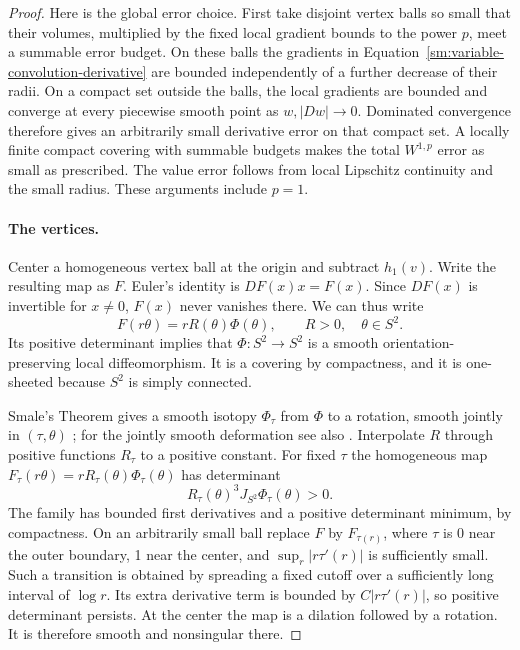 \documentclass[11pt]{article}
\numberwithin{equation}{section}
\theoremstyle{definition}
\theoremstyle{remark}
\begin{document}
\begin{proof}
Here is the global error choice.  First take disjoint vertex balls
so small that their volumes, multiplied by the fixed local
gradient bounds to the power $p$, meet a summable error budget.
On these balls the gradients in
Equation~\eqref{sm:variable-convolution-derivative} are bounded independently
of a further decrease of their radii.  On a compact set outside
the balls, the local gradients are bounded and converge at every
piecewise smooth point as $w,|Dw|\to0$.  Dominated convergence
therefore gives an arbitrarily small derivative error on that
compact set.  A locally finite compact covering with summable
budgets makes the total $W^{1,p}$ error as small as prescribed.
The value error follows from local Lipschitz continuity and the
small radius.  These arguments include $p=1$.

\paragraph{The vertices.}
Center a homogeneous vertex ball at the origin and subtract
$h_1(v)$.  Write the resulting map as $F$.  Euler's identity is
$DF(x)x=F(x)$.  Since $DF(x)$ is invertible for $x\ne0$, $F(x)$
never vanishes there.  We can thus write
\begin{equation}
 \label{sm:vertex-form}
 F(r\theta)=rR(\theta)\Phi(\theta),\qquad
 R>0,\quad\theta\in S^2.
\end{equation}
Its positive determinant implies that $\Phi:S^2\to S^2$ is a
smooth orientation-preserving local diffeomorphism.  It is a
covering by compactness, and it is one-sheeted because $S^2$ is
simply connected.

Smale's Theorem gives a smooth isotopy $\Phi_\tau$ from $\Phi$
to a rotation, smooth jointly in $(\tau,\theta)$
\cite[Theorem~6]{Smale1959}; for the jointly smooth deformation see also
\cite[Theorem~1.5]{LiWatts2011}.  Interpolate $R$ through positive
functions $R_\tau$ to a positive constant.  For fixed $\tau$ the
homogeneous map
$F_\tau(r\theta)=rR_\tau(\theta)\Phi_\tau(\theta)$
has determinant
\[
 R_\tau(\theta)^3 J_{S^2}\Phi_\tau(\theta)>0.
\]
The family has bounded first derivatives and a positive
determinant minimum, by compactness.  On an arbitrarily small
ball replace $F$ by $F_{\tau(r)}$, where $\tau$ is 0 near the
outer boundary, 1 near the center, and
$\sup_r|r\tau'(r)|$ is sufficiently small.  Such a transition
is obtained by spreading a fixed cutoff over a sufficiently
long interval of $\log r$.  Its extra derivative term is
bounded by $C|r\tau'(r)|$, so positive determinant persists.
At the center the map is a dilation followed by a rotation.
It is therefore smooth and nonsingular there.


\end{proof}
\end{document}

